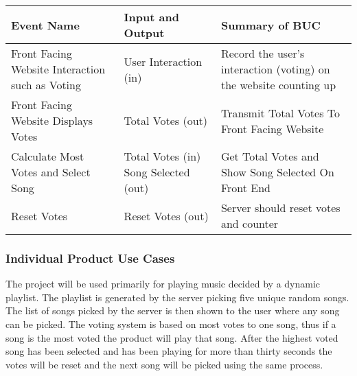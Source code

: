 \documentclass[12pt, titlepage]{article}
\begin{document}
\begin{center}
\begin{table}[H]
\begin{tabularx}{\textwidth}{| X | X | X |}
\hline
\textbf{Event Name} &\textbf{Input and Output} &\textbf{Summary of BUC}  \\
\hline
Front Facing Website Interaction such as Voting & User Interaction (in) & Record the user's interaction (voting) on the website counting up\\
\hline
Front Facing Website Displays Votes  & Total Votes (out) & Transmit Total Votes To Front Facing Website \\
\hline
 Calculate Most Votes and Select Song & Total Votes (in)
Song Selected (out) & Get Total Votes and Show Song Selected On Front End\\
\hline
Reset Votes & Reset Votes (out) & Server should reset votes and counter \\
\hline
\end{tabularx}
\end{table}
\end{center}

\subsubsection{Individual Product Use Cases}

The project will be used primarily for playing music decided by a dynamic playlist. The playlist is generated by the server picking five unique random songs. The list of songs picked by the server is then shown to the user where any song can be picked. The voting system is based on most votes to one song, thus if a song is the most voted the product will play that song. After the highest voted song has been selected and has been playing for more than thirty seconds the votes will be reset and the next song will be picked using the same process.
\end{document}
